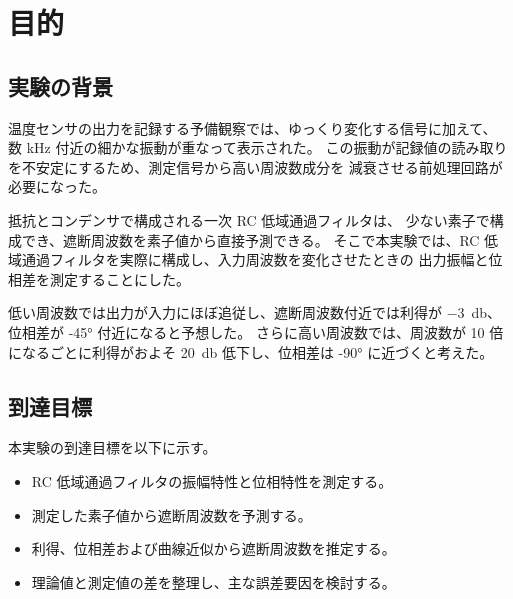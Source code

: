 \section{目的}
\label{sec:purpose}

\subsection{実験の背景}
\label{subsec:background}

温度センサの出力を記録する予備観察では、ゆっくり変化する信号に加えて、
数 \unit{\kilo\hertz} 付近の細かな振動が重なって表示された。
この振動が記録値の読み取りを不安定にするため、測定信号から高い周波数成分を
減衰させる前処理回路が必要になった。

抵抗とコンデンサで構成される一次 RC 低域通過フィルタは、
少ない素子で構成でき、遮断周波数を素子値から直接予測できる。
そこで本実験では、RC 低域通過フィルタを実際に構成し、入力周波数を変化させたときの
出力振幅と位相差を測定することにした。

低い周波数では出力が入力にほぼ追従し、遮断周波数付近では利得が
\qty{-3}{\decibel}、位相差が \ang{-45} 付近になると予想した。
さらに高い周波数では、周波数が 10 倍になるごとに利得がおよそ
\qty{20}{\decibel} 低下し、位相差は \ang{-90} に近づくと考えた。


\subsection{到達目標}
\label{subsec:objectives}

本実験の到達目標を以下に示す。

\begin{itemize}[leftmargin=2.8em,nosep]
  \item RC 低域通過フィルタの振幅特性と位相特性を測定する。
  \item 測定した素子値から遮断周波数を予測する。
  \item 利得、位相差および曲線近似から遮断周波数を推定する。
  \item 理論値と測定値の差を整理し、主な誤差要因を検討する。
\end{itemize}

